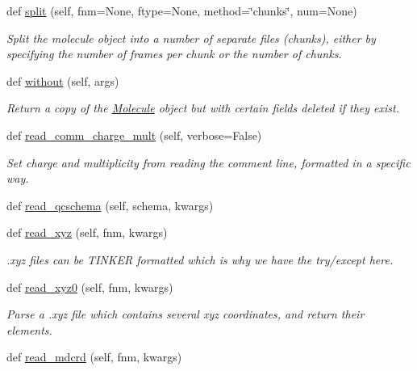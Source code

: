 \begin{DoxyCompactItemize}
def \hyperlink{classsrc_1_1molecule_1_1Molecule_a004a64d4b979002026c23d15a79e8dfc}{split} (self, fnm=None, ftype=None, method=\char`\"{}chunks\char`\"{}, num=None)
\begin{DoxyCompactList}\small\item\em Split the molecule object into a number of separate files (chunks), either by specifying the number of frames per chunk or the number of chunks. \end{DoxyCompactList}\item 
def \hyperlink{classsrc_1_1molecule_1_1Molecule_aeab236a12cffd66ce282c1a7d03af7f9}{without} (self, args)
\begin{DoxyCompactList}\small\item\em Return a copy of the \hyperlink{classsrc_1_1molecule_1_1Molecule}{Molecule} object but with certain fields deleted if they exist. \end{DoxyCompactList}\item 
def \hyperlink{classsrc_1_1molecule_1_1Molecule_a7aeff86c1d2b8f73bea9191b33f665c3}{read\+\_\+comm\+\_\+charge\+\_\+mult} (self, verbose=False)
\begin{DoxyCompactList}\small\item\em Set charge and multiplicity from reading the comment line, formatted in a specific way. \end{DoxyCompactList}\item 
def \hyperlink{classsrc_1_1molecule_1_1Molecule_a1b0681641dfbba1c2d182151b5e60f5d}{read\+\_\+qcschema} (self, schema, kwargs)
\item 
def \hyperlink{classsrc_1_1molecule_1_1Molecule_a36a4504f013d86188435e01231235386}{read\+\_\+xyz} (self, fnm, kwargs)
\begin{DoxyCompactList}\small\item\em .xyz files can be T\+I\+N\+K\+ER formatted which is why we have the try/except here. \end{DoxyCompactList}\item 
def \hyperlink{classsrc_1_1molecule_1_1Molecule_a4b84ec657b8c89c34674bb205f7eb1b2}{read\+\_\+xyz0} (self, fnm, kwargs)
\begin{DoxyCompactList}\small\item\em Parse a .xyz file which contains several xyz coordinates, and return their elements. \end{DoxyCompactList}\item 
def \hyperlink{classsrc_1_1molecule_1_1Molecule_aa7a40df32ff22ef52b902ac6a24dcb50}{read\+\_\+mdcrd} (self, fnm, kwargs)

\end{DoxyCompactItemize}
